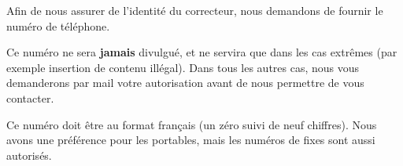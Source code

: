 Afin de nous assurer de l'identité du correcteur, nous demandons de fournir le numéro de téléphone.

Ce numéro ne sera \textbf{jamais} divulgué, et ne servira que dans les cas extrêmes (par exemple insertion de contenu illégal).
Dans tous les autres cas, nous vous demanderons par mail votre autorisation avant de nous permettre de vous contacter.

Ce numéro doit être au format français (un zéro suivi de neuf chiffres). Nous avons une préférence pour les portables, mais les numéros de fixes sont aussi autorisés.